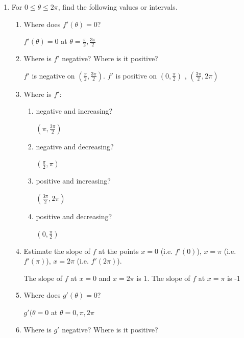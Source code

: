 \documentclass[nooutcomes,handout]{ximera}
\begin{document}
\begin{problem}
\begin{enumerate}
	\item For $0 \leq \theta \leq 2\pi$, find the following values or intervals.
		\begin{enumerate}
			\item Where does $f'(\theta)=0$?
		\begin{freeResponse}
			$f'(\theta)=0$ at $\theta=\frac{\pi}{2},\frac{3\pi}{2}$
		\end{freeResponse}
			\item Where is $f'$ negative?  Where is it positive?
		\begin{freeResponse}
			$f'$ is negative on $\left( \frac{\pi}{2},\frac{3 \pi}{2}\right)$.  $f'$ is positive on $ \left( 0,\frac{\pi}{2} \right)$ , $ \left( \frac{3 \pi}{2},2 \pi \right)$
		\end{freeResponse}
			\item Where is $f'$:
			\begin{enumerate}
			\item negative and increasing?
				\begin{freeResponse}
					$(\pi,\frac{3\pi}{2})$
				\end{freeResponse}
			\item negative and decreasing?
				\begin{freeResponse}
					$(\frac{\pi}{2},\pi)$
				\end{freeResponse}
			\item positive and increasing?
				\begin{freeResponse}
					$(\frac{3\pi}{2},2\pi)$
				\end{freeResponse}
			\item positive and decreasing?
				\begin{freeResponse}
					$(0,\frac{\pi}{2})$
				\end{freeResponse}
			\end{enumerate}
			\item Estimate the slope of $f$ at the points $x=0$ (i.e. $f'(0)$), $x=\pi$ (i.e. $f'(\pi)$), $x=2\pi$ (i.e. $f'(2\pi)$).
				\begin{freeResponse}
					The slope of $f$ at $x=0$ and $x=2\pi$ is 1.  	The slope of $f$ at $x=\pi$ is -1
				\end{freeResponse}
			\item Where does $g'(\theta)=0$?
		\begin{freeResponse}
			$g'(\theta=0$ at $\theta=0,\pi,2\pi$
		\end{freeResponse}
			\item Where is $g'$ negative?  Where is it positive?

\end{enumerate}
\end{enumerate}
\end{problem}
\end{document}
